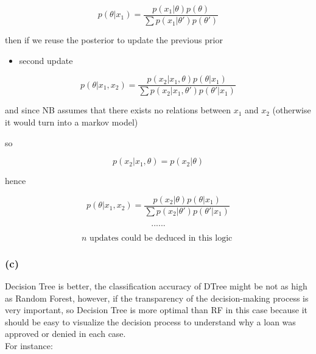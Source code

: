 \documentclass[11pt]{article}
\providecommand{\tightlist}{%
      \setlength{\itemsep}{0pt}\setlength{\parskip}{0pt}}
\begin{document}
\[p(\theta| x_1) = \frac{p(x_1 | \theta) p(\theta)}{\sum p(x_1| \theta') p(\theta') }\]

then if we reuse the posterior to update the previous prior

\begin{itemize}
\tightlist
\item
  second update
\end{itemize}

\[p(\theta | x_1, x_2) = \frac{p(x_2| x_1, \theta) p(\theta | x_1)}{\sum p(x_2| x_1, \theta') p(\theta' | x_1)}\]

and since NB assumes that there exists no relations between \(x_1\) and
\(x_2\) (otherwise it would turn into a markov model)

so

\[p(x_2 | x_1, \theta) = p(x_2 | \theta)\]

hence

\[p(\theta | x_1, x_2) = \frac{p(x_2| \theta) p(\theta | x_1)}{\sum p(x_2| \theta') p(\theta' | x_1)}\]

\[......\]

\[n \text{ updates could be deduced in this logic }\]

    \subsubsection*{(c)}\label{c}

    Decision Tree is better, the classification accuracy of DTree might be
not as high as Random Forest, however, if the transparency of the
decision-making process is very important, so Decision Tree is more
optimal than RF in this case because it should be easy to visualize the
decision process to understand why a loan was approved or denied in each
case.\\

For instance:
\end{document}
